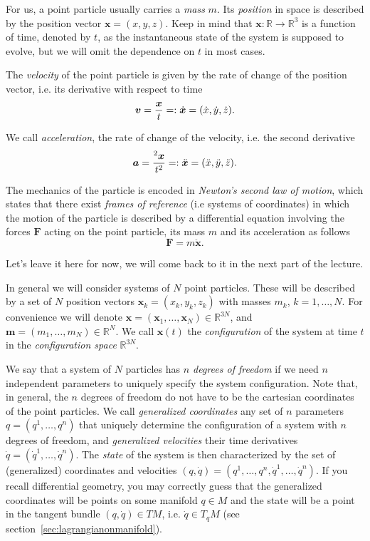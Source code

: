\documentclass[english,fontsize=11pt,paper=a5,oneside]{scrbook}
\newcommand{\R}{\mathbb{R}}
\newcommand{\bx}{\bm{x}}
\newcommand{\bv}{\bm{v}}
\let\d\relax
\DeclareMathOperator{\d}{d}
\newcommand{\der}[2]{\frac{\d{#1}}{\d{#2}}}
\theoremstyle{definition}
\begin{document}
For us, a point particle usually carries a \emph{mass} $m$.
Its \emph{position} in space is described by the position vector $\bx = (x, y ,z)$.
Keep in mind that $\bx : \R\to\R^3$ is a function of time, denoted by $t$, as the instantaneous state of the system is supposed to evolve, but we will omit the dependence on $t$ in most cases. 

The \emph{velocity} of the point particle is given by the rate of change of the position vector, i.e. its derivative with respect to time
\begin{equation}
    \bv = \der{\bx}{t} =: \dot{\bx} = (\dot{x}, \dot{y}, \dot{z}).
\end{equation}

We call \emph{acceleration}, the rate of change of the velocity, i.e. the second derivative
\begin{equation}
    \bm{a} = \der{^2\bx}{t^2} =: \ddot{\bx} = (\ddot{x}, \ddot{y}, \ddot{z}).
\end{equation}

\begin{tcolorbox}
The mechanics of the particle is encoded in \emph{Newton's second law of motion}, which states that there exist \emph{frames of reference} (i.e systems of coordinates) in which the motion of the particle is described by a differential equation involving the forces $\bm{F}$ acting on the point particle, its mass $m$ and its acceleration as follows
\begin{equation}\label{eq:newton}
    \bm F = m \ddot{\bx}.
\end{equation}
\end{tcolorbox}
Let's leave it here for now, we will come back to it in the next part of the lecture.

In general we will consider systems of $N$ point particles.
These will be described by a set of $N$ position vectors $\bx_k = (x_k, y_k ,z_k)$ with masses $m_k$, $k = 1, \ldots, N$.
For convenience we will denote $\bx = (\bx_1, \ldots, \bx_N)\in\R^{3N}$, and $\bm{m} = (m_1, \ldots, m_N)\in\R^N$.
We call $\bx(t)$ the \emph{configuration} of the system at time $t$ in the \emph{configuration space} $\R^{3N}$.

We say that a system of $N$ particles has \emph{$n$ degrees of freedom} if we need $n$ independent parameters to uniquely specify the system configuration. Note that, in general, the $n$ degrees of freedom do not have to be the cartesian coordinates of the point particles. We call \emph{generalized coordinates} any set of $n$ parameters $q = (q^1, \ldots, q^n)$ that uniquely determine the configuration of a system with $n$ degrees of freedom, and \emph{generalized velocities} their time derivatives $\dot q = (\dot q^1, \ldots, \dot q^n)$. The \emph{state} of the system is then characterized by the set of (generalized) coordinates and velocities $(q,\dot q) = \left(q^1, \ldots, q^n,\dot q^1, \ldots, \dot q^n\right)$. If you recall differential geometry, you may correctly guess that the generalized coordinates will be points on some manifold $q\in M$ and the state will be a point in the tangent bundle $(q, \dot q)\in TM$, i.e. $\dot q \in T_q M$ (see section~\ref{sec:lagrangianonmanifold}).
\end{document}
